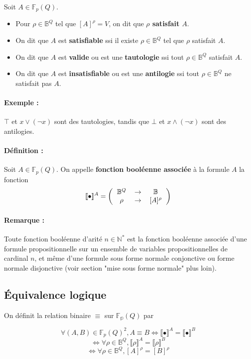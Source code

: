 \documentclass{scrartcl}
\newcommand{\rem}[1]{\paragraph{Remarque : } #1\\}
\newcommand{\exemple}[1]{\paragraph{Exemple : } #1\\}
\newcommand{\intset}[1]{\llbracket #1 \rrbracket}
\begin{document}
			Soit $A \in \mathbb{F}_p (Q)$.

			\begin{itemize}
				\item Pour $\rho \in \mathbb{B}^Q$ tel que $[A]^\rho = V$, on dit que \textbf{$\rho$ satisfait $A$}.
				\item On dit que $A$ est \textbf{satisfiable} ssi il existe $\rho \in \mathbb{B}^Q$ tel que $\rho$ satisfait $A$.
				\item On dit que $A$ est \textbf{valide} ou est une \textbf{tautologie} ssi tout $\rho \in \mathbb{B}^Q$ satisfait $A$. 
				\item On dit que $A$ est \textbf{insatisfiable} ou est une \textbf{antilogie} ssi tout $\rho \in \mathbb{B}^Q$ ne satisfait pas $A$. 
			\end{itemize}	

			\exemple{$\top$ et $x \vee (\neg x)$ sont des tautologies, tandis que $\bot$ et $x \wedge (\neg x)$ sont des antilogies.}

			\paragraph{Définition :} Soit $A \in \mathbb{F}_p(Q)$. On appelle \textbf{fonction booléenne associée} à la formule $A$ la fonction
			\[
				\intset{\bullet}^A = \left(
				\begin{tabular}{c c c}
					$\mathbb{B}^Q$ & $\rightarrow$ & $\mathbb{B}$ \\
					$\rho$ & $\rightarrow$ & $[A]^\rho$
				\end{tabular}
				\right)
			\]
			
			\rem{Toute fonction booléenne d'arité $n \in \mathbb{N}^*$ est la fonction booléenne associée d'une formule propositionnelle sur un ensemble de variables propositionnelles de cardinal $n$, et même d'une formule sous forme normale conjonctive ou forme normale disjonctive (voir section "mise sous forme normale" plus loin).}

		\subsection{Équivalence logique}
			On définit la relation binaire $\equiv$ sur $\mathbb{F_p}(Q)$ par

			\[
				\forall (A,B) \in \mathbb{F}_p(Q)^2, A \equiv B \Leftrightarrow \intset{\bullet}^A = \intset{\bullet}^B
			\]\[
				\Leftrightarrow \forall \rho \in \mathbb{B}^Q, \intset{\rho}^A = \intset{\rho}^B
			\]\[
				\Leftrightarrow \forall \rho \in \mathbb{B}^Q, [A]^\rho = [B]^\rho
			\]
\end{document}
